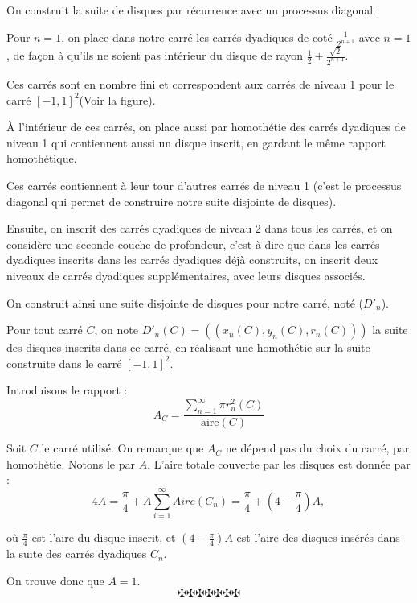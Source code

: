 On construit la suite de disques par r{\'e}currence avec un
processus diagonal :

Pour $n = 1$, on place dans notre carr{\'e} les carr{\'e}s dyadiques de
cot{\'e} $\frac{1}{2^{n + 1}}$ avec $n = 1$, de fa{\c c}on {\`a} qu'ils ne
soient pas int{\'e}rieur du disque de rayon $\frac{1}{2} +
\frac{\sqrt{2}}{2^{n + 1}}$.

Ces carr{\'e}s sont en nombre fini et correspondent aux carr{\'e}s de niveau 1
pour le carr{\'e} $[- 1, 1]^2$(Voir la figure).

{\`A} l'int{\'e}rieur de ces carr{\'e}s, on place aussi par homoth{\'e}tie
des carr{\'e}s dyadiques de niveau 1 qui contiennent aussi un disque inscrit,
en gardant le m{\^e}me rapport homoth{\'e}tique.

Ces carr{\'e}s contiennent {\`a} leur tour d'autres carr{\'e}s de niveau 1
(c'est le processus diagonal qui permet de construire notre suite disjointe de
disques).

Ensuite, on inscrit des carr{\'e}s dyadiques de niveau 2 dans tous les
carr{\'e}s, et on consid{\`e}re une seconde couche de profondeur,
c'est-{\`a}-dire que dans les carr{\'e}s dyadiques inscrits dans les
carr{\'e}s dyadiques d{\'e}j{\`a} construits, on inscrit deux niveaux de
carr{\'e}s dyadiques suppl{\'e}mentaires, avec leurs disques associ{\'e}s.

On construit ainsi une suite disjointe de disques pour notre carr{\'e},
not{\'e} ($D'_n$).

Pour tout carr{\'e} $C$, on note $D'_n (C) = ((x_n (C), y_n (C), r_n (C)))$ la
suite des disques inscrits dans ce carr{\'e}, en r{\'e}alisant une
homoth{\'e}tie sur la suite construite dans le carr{\'e} $[- 1, 1]^2$.

Introduisons le rapport :
\[ A_C = \frac{\sum_{n = 1}^{\infty} \pi r_n^2 (C)}{\text{aire} (C)} \]


Soit $C$ le carr{\'e} utilis{\'e}. On remarque que $A_C$ ne d{\'e}pend pas du
choix du carr{\'e}, par homoth{\'e}tie. Notons le par $A$. L'aire totale
couverte par les disques est donn{\'e}e par :
\[ 4 A = \frac{\pi}{4} + A \sum_{i = 1}^{\infty} Aire (C_n) = \frac{\pi}{4} +
   \left( 4 - \frac{\pi}{4} \right) A, \]


o{\`u} $\frac{\pi}{4}$ est l'aire du disque inscrit, et $\left( 4 -
\frac{\pi}{4} \right) A$ est l'aire des disques ins{\'e}r{\'e}s dans la suite
des carr{\'e}s dyadiques $C_n$.

On trouve donc que $A = 1$.
\[ \maltese \maltese \maltese \maltese \maltese \maltese \maltese \]
